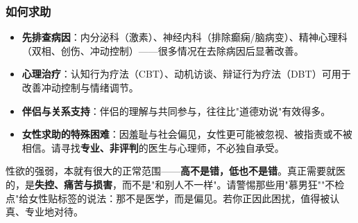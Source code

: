 \subsubsection{如何求助}

\begin{itemize}
	\item \textbf{先排查病因}：内分泌科（激素）、神经内科（排除癫痫/脑病变）、精神心理科（双相、创伤、冲动控制）——很多情况在去除病因后显著改善。
	\item \textbf{心理治疗}：认知行为疗法（CBT）、动机访谈、辩证行为疗法（DBT）可用于改善冲动控制与情绪调节。
	\item \textbf{伴侣与关系支持}：伴侣的理解与共同参与，往往比"道德劝说"有效得多。
	\item \textbf{女性求助的特殊困难}：因羞耻与社会偏见，女性更可能被忽视、被指责或不被相信。请寻找\textbf{专业、非评判}的医生与心理师，不必独自承受。
\end{itemize}

\begin{tcolorbox}[colback=purple!5!white,colframe=purple!55!black,title=贴心小叮咛]
性欲的强弱，本就有很大的正常范围——\textbf{高不是错，低也不是错}。真正需要就医的，是\textbf{失控、痛苦与损害}，而不是"和别人不一样"。请警惕那些用"慕男狂""不检点"给女性贴标签的说法：那不是医学，而是偏见。若你正因此困扰，值得被认真、专业地对待。
\end{tcolorbox}
